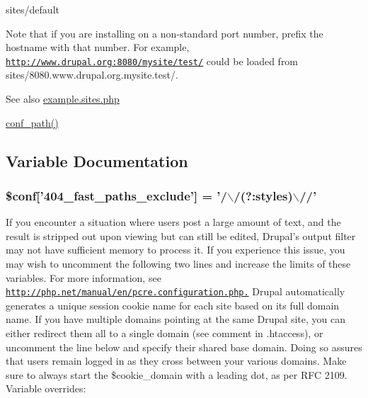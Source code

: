 \begin{DoxyItemize}
\item sites/default
\end{DoxyItemize}

Note that if you are installing on a non-\/standard port number, prefix the hostname with that number. For example, \href{http://www.drupal.org:8080/mysite/test/}{\tt http://www.drupal.org:8080/mysite/test/} could be loaded from sites/8080.www.drupal.org.mysite.test/.

\begin{DoxySeeAlso}{See also}
\hyperlink{example_8sites_8php}{example.sites.php} 

\hyperlink{bootstrap_8inc_acef612ef19c49f6259531f0bee5c26cc}{conf\_\-path()} 
\end{DoxySeeAlso}


\subsection{Variable Documentation}
\hypertarget{settings_8php_ad6ddcdefc93f69592fa04339ffd242c4}{
\subsubsection[{\$conf}]{\setlength{\rightskip}{0pt plus 5cm}\$conf\mbox{[}'404\_\-fast\_\-paths\_\-exclude'\mbox{]} = '/$\backslash$/(?:styles)$\backslash$//'}}
\label{settings_8php_ad6ddcdefc93f69592fa04339ffd242c4}
If you encounter a situation where users post a large amount of text, and the result is stripped out upon viewing but can still be edited, Drupal's output filter may not have sufficient memory to process it. If you experience this issue, you may wish to uncomment the following two lines and increase the limits of these variables. For more information, see \href{http://php.net/manual/en/pcre.configuration.php.}{\tt http://php.net/manual/en/pcre.configuration.php.} Drupal automatically generates a unique session cookie name for each site based on its full domain name. If you have multiple domains pointing at the same Drupal site, you can either redirect them all to a single domain (see comment in .htaccess), or uncomment the line below and specify their shared base domain. Doing so assures that users remain logged in as they cross between your various domains. Make sure to always start the \$cookie\_\-domain with a leading dot, as per RFC 2109. Variable overrides:


